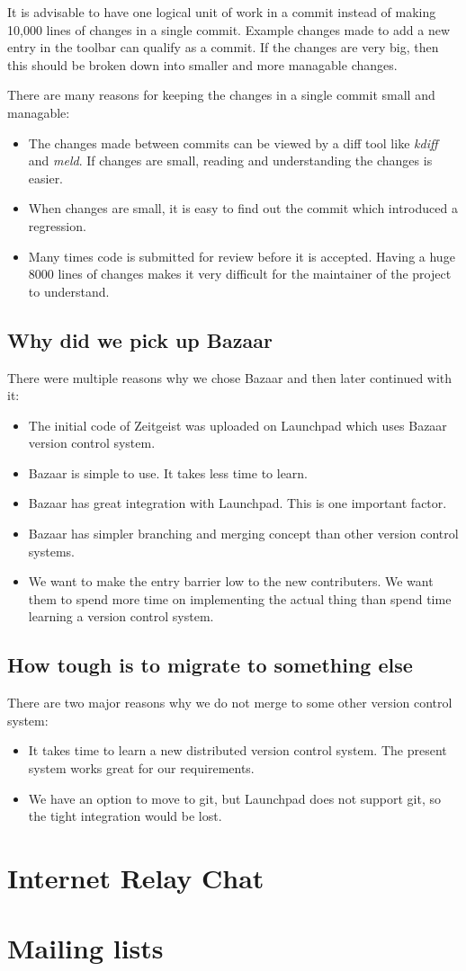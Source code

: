 It is advisable to have one logical unit of work in a commit instead of making 10,000 
lines of changes in a single commit. Example changes made to add a new entry in the toolbar 
can qualify as a commit. If the changes are very big, then this should be broken down into 
smaller and more managable changes. 

There are many reasons for keeping the changes in a single commit small and managable: 

\begin{itemize}
\item The changes made between commits can be viewed by a diff tool like \textit{kdiff} and \textit{meld}. 
If changes are small, reading and understanding the changes is easier.
\item When changes are small, it is easy to find out the commit which introduced a regression.
\item Many times code is submitted for review before it is accepted. Having a huge 8000 lines 
of changes makes it very difficult for the maintainer of the project to understand.
\end{itemize}

\subsection{Why did we pick up Bazaar}
There were multiple reasons why we chose Bazaar and then later continued with it: 
\begin{itemize}
\item The initial code of Zeitgeist was uploaded on Launchpad which uses Bazaar version control system.
\item Bazaar is simple to use. It takes less time to learn.
\item Bazaar has great integration with Launchpad. This is one important factor.
\item Bazaar has simpler branching and merging concept than other version control systems.
\item We want to make the entry barrier low to the new contributers. We want them to spend more time 
on implementing the actual thing than spend time learning a version control system.
\end{itemize}

\subsection{How tough is to migrate to something else}
There are two major reasons why we do not merge to some other version control system: 
\begin{itemize}
\item It takes time to learn a new distributed version control system. The present system works 
great for our requirements.
\item We have an option to move to git, but Launchpad does not support git, so the tight 
integration would be lost.
\end{itemize}


\section{Internet Relay Chat}
\section{Mailing lists}